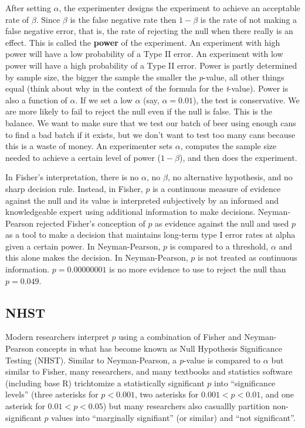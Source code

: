 \documentclass[]{book}
\begin{document}
After setting \(\alpha\), the experimenter designs the experiment to
achieve an acceptable rate of \(\beta\). Since \(\beta\) is the false
negative rate then \(1-\beta\) is the rate of not making a false
negative error, that is, the rate of rejecting the null when there
really is an effect. This is called the \textbf{power} of the
experiment. An experiment with high power will have a low probability of
a Type II error. An experiment with low power will have a high
probability of a Type II error. Power is partly determined by sample
size, the bigger the sample the smaller the \emph{p}-value, all other
things equal (think about why in the context of the formula for the
\emph{t}-value). Power is also a function of \(\alpha\). If we set a low
\(\alpha\) (say, \(\alpha=0.01\)), the test is conservative. We are more
likely to fail to reject the null even if the null is false. This is the
balance. We want to make sure that we test our batch of beer using
enough cans to find a bad batch if it exists, but we don't want to test
too many cans because this is a waste of money. An experimenter sets
\(\alpha\), computes the sample size needed to achieve a certain level
of power (\(1-\beta\)), and then does the experiment.

In Fisher's interpretation, there is no \(\alpha\), no \(\beta\), no
alternative hypothesis, and no sharp decision rule. Instead, in Fisher,
\(p\) is a continuous measure of evidence against the null and its value
is interpreted subjectively by an informed and knowledgeable expert
using additional information to make decisions. Neyman-Pearson rejected
Fisher's conception of \(p\) as evidence against the null and used \(p\)
as a tool to make a decision that maintains long-term type I error rates
at alpha given a certain power. In Neyman-Pearson, \(p\) is compared to
a threshold, \(\alpha\) and this alone makes the decision. In
Neyman-Pearson, \(p\) is not treated as continuous information.
\(p=0.00000001\) is no more evidence to use to reject the null than
\(p=0.049\).

\subsection{NHST}\label{nhst}

Modern researchers interpret \(p\) using a combination of Fisher and
Neyman-Pearson concepts in what has become known as Null Hypothesis
Significance Testing (NHST). Similar to Neyman-Pearson, a \emph{p}-value
is compared to \(\alpha\) but similar to Fisher, many researchers, and
many textbooks and statistics software (including base R) trichtomize a
statistically significant \(p\) into ``significance levels'' (three
asterisks for \(p < 0.001\), two asterisks for \(0.001 < p < 0.01\), and
one asterisk for \(0.01 < p < 0.05\)) but many researchers also
casuallly partition non-significant \(p\) values into ``marginally
signifiant'' (or similar) and ``not significant''.
\end{document}
